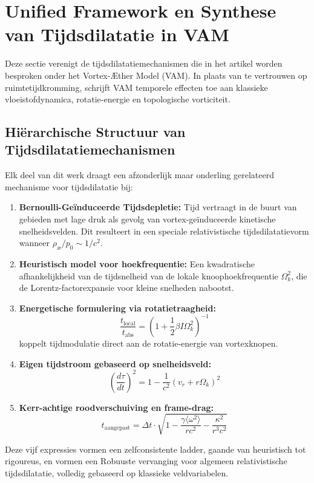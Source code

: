 \section{Unified Framework en Synthese van Tijdsdilatatie in VAM}

Deze sectie verenigt de tijdsdilatatiemechanismen die in het artikel worden besproken onder het Vortex-Æther Model (VAM). In plaats van te vertrouwen op ruimtetijdkromming, schrijft VAM temporele effecten toe aan klassieke vloeistofdynamica, rotatie-energie en topologische vorticiteit.

\subsection{Hiërarchische Structuur van Tijdsdilatatiemechanismen}

Elk deel van dit werk draagt ​​een afzonderlijk maar onderling gerelateerd mechanisme voor tijdsdilatatie bij:

\begin{enumerate}
\item \textbf{Bernoulli-Geïnduceerde Tijdsdepletie:} Tijd vertraagt ​​in de buurt van gebieden met lage druk als gevolg van vortex-geïnduceerde kinetische snelheidsvelden. Dit resulteert in een speciale relativistische tijdsdilatatievorm wanneer \( \rho_{\text{\ae}} / p_0 \sim 1/c^2 \).
\item \textbf{Heuristisch model voor hoekfrequentie:} Een kwadratische afhankelijkheid van de tijdsnelheid van de lokale knoophoekfrequentie \( \Omega_k^2 \), die de Lorentz-factorexpansie voor kleine snelheden nabootst.
\item \textbf{Energetische formulering via rotatietraagheid:}
\[
\boxed{\frac{t_{\text{local}}}{t_{\text{abs}}} = \left(1 + \frac{1}{2} \beta I \Omega_k^2 \right)^{-1}}
\]
koppelt tijdmodulatie direct aan de rotatie-energie van vortexknopen. \item \textbf{Eigen tijdstroom gebaseerd op snelheidsveld:}
\[
\boxed{\left( \frac{d\tau}{dt} \right)^2 = 1 - \frac{1}{c^2}(v_r + r\Omega_k)^2}
\]
\item \textbf{Kerr-achtige roodverschuiving en frame-drag:}
\[
\boxed{t_{\text{aangepast}} = \Delta t \cdot \sqrt{1 - \frac{\gamma \langle \omega^2 \rangle}{rc^2} - \frac{\kappa^2}{r^3c^2}}}
\]
\end{enumerate}

Deze vijf expressies vormen een zelfconsistente ladder, gaande van heuristisch tot rigoureus, en vormen een Robuuste vervanging voor algemeen relativistische tijdsdilatatie, volledig gebaseerd op klassieke veldvariabelen.

